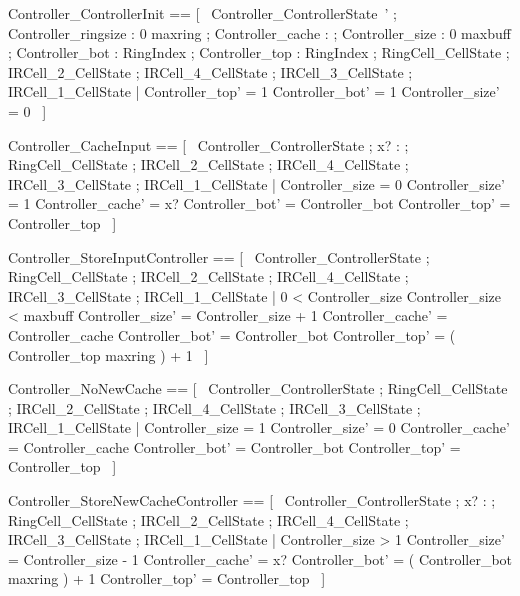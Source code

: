 \documentclass{article}
\begin{document}
\begin{zed}
	Controller\_ControllerInit == [~  Controller\_ControllerState~' ; Controller\_ringsize : 0 \upto maxring ; Controller\_cache : \nat ; Controller\_size : 0 \upto maxbuff ; Controller\_bot : RingIndex ; Controller\_top : RingIndex ; \Xi RingCell\_CellState ; \Xi IRCell\_2\_CellState ; \Xi IRCell\_4\_CellState ; \Xi IRCell\_3\_CellState ; \Xi IRCell\_1\_CellState | Controller\_top' = 1 \land Controller\_bot' = 1 \land Controller\_size' = 0  ~]
\end{zed}

\begin{zed}
	Controller\_CacheInput == [~  \Delta Controller\_ControllerState ; x? : \nat ; \Xi RingCell\_CellState ; \Xi IRCell\_2\_CellState ; \Xi IRCell\_4\_CellState ; \Xi IRCell\_3\_CellState ; \Xi IRCell\_1\_CellState | Controller\_size = 0 \land Controller\_size' = 1 \land Controller\_cache' = x? \land Controller\_bot' = Controller\_bot \land Controller\_top' = Controller\_top  ~]
\end{zed}

\begin{zed}
	Controller\_StoreInputController == [~  \Delta Controller\_ControllerState ; \Xi RingCell\_CellState ; \Xi IRCell\_2\_CellState ; \Xi IRCell\_4\_CellState ; \Xi IRCell\_3\_CellState ; \Xi IRCell\_1\_CellState | 0 < Controller\_size \land Controller\_size < maxbuff \land Controller\_size' = Controller\_size + 1 \land Controller\_cache' = Controller\_cache \land Controller\_bot' = Controller\_bot \land Controller\_top' = ( Controller\_top \mod maxring ) + 1  ~]
\end{zed}

\begin{zed}
	Controller\_NoNewCache == [~  \Delta Controller\_ControllerState ; \Xi RingCell\_CellState ; \Xi IRCell\_2\_CellState ; \Xi IRCell\_4\_CellState ; \Xi IRCell\_3\_CellState ; \Xi IRCell\_1\_CellState | Controller\_size = 1 \land Controller\_size' = 0 \land Controller\_cache' = Controller\_cache \land Controller\_bot' = Controller\_bot \land Controller\_top' = Controller\_top  ~]
\end{zed}

\begin{zed}
	Controller\_StoreNewCacheController == [~  \Delta Controller\_ControllerState ; x? : \nat ; \Xi RingCell\_CellState ; \Xi IRCell\_2\_CellState ; \Xi IRCell\_4\_CellState ; \Xi IRCell\_3\_CellState ; \Xi IRCell\_1\_CellState | Controller\_size > 1 \land Controller\_size' = Controller\_size - 1 \land Controller\_cache' = x? \land Controller\_bot' = ( Controller\_bot \mod maxring ) + 1 \land Controller\_top' = Controller\_top  ~]
\end{zed}
\end{document}
